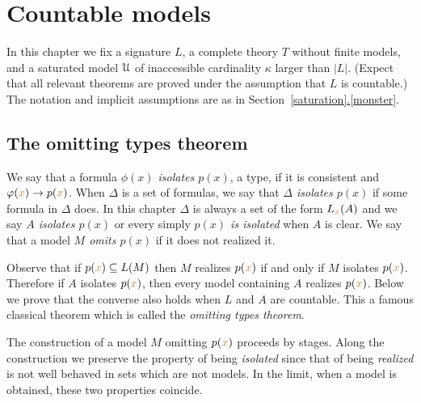 \documentclass[creche.tex]{subfiles}
\begin{document}
\chapter{Countable models}
\label{countable}

\def\ceq#1#2#3{\parbox[b]{30ex}{$\displaystyle #1$}\parbox[b]{6ex}{\hfil$#2$}$\displaystyle #3$}




In this chapter we fix a signature $L$, a complete theory $T$ without finite models, and a saturated model $\EuScript U$ of inaccessible cardinality $\kappa$ larger than $|L|$. (Expect that all relevant theorems are proved under the assumption that $L$ is countable.) The notation and implicit assumptions are as in Section~\hyperref[saturation]{\ref*{saturation}.\ref*{monster}}.


\section{The omitting types theorem}\label{omttingtype}

We say that a formula \emph{$\phi(x)$ isolates $p(x)$}, a type, if it is consistent and $\varphi({\color{brown} x})\rightarrow p({\color{brown} x})$. When $\Delta$ is a set of formulas, we say that \emph{$\Delta$ isolates $p(x)$\/} if some formula in $\Delta$ does. In this chapter $\Delta$ is always a set of the form $L_{{\color{brown} x}}(A)$ and we say  \emph{$A$ isolates $p(x)$\/} or every simply \emph{$p(x)$ is isolated\/} when $A$ is clear. We say that a model \emph{$M$ omits $p(x)$\/} if it does not realized it. 

Observe that if $p({\color{brown} x})\subseteq L(M)$ then $M$ realizes $p({\color{brown} x})$ if and only if $M$ isolates  $p({\color{brown} x})$. Therefore if $A$ isolates $p({\color{brown} x})$, then every model containing $A$ realizes $p({\color{brown} x})$. Below we prove that the converse also holds when $L$ and $A$ are countable. This a famous classical theorem  which is called the \textit{omitting types theorem}. 

The construction of a model $M$ omitting $p({\color{brown} x})$ proceeds by stages. Along the construction we preserve the property of being {\em isolated\/}  since that of being {\em realized\/} is not well behaved in sets which are not models. In the limit, when a model is obtained, these two properties coincide. 
\end{document}
